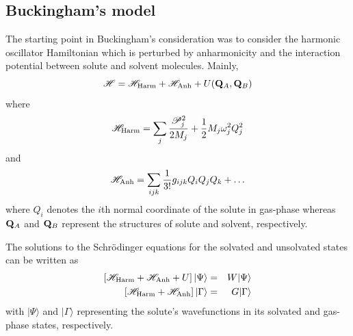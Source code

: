 \documentclass[a4paper,titlepage,twoside,fleqn,12pt]{book}
\begin{document}
\begin{refsection}
\section{Buckingham's model  \label{s:buckingham-theory}}

The starting point in Buckingham's consideration was to consider 
the harmonic oscillator Hamiltonian which is perturbed by anharmonicity
and the interaction potential between solute and solvent molecules. Mainly,
%
\begin{equation}
\mathscr{H} = \mathscr{H}_{\rm Harm} + \mathscr{H}_{\rm Anh} + U({\bf Q}_A,{\bf Q}_B)
\end{equation}
%
where
%
\begin{equation}\label{e:h_harm}
\mathscr{H}_{\rm Harm} = 
\sum_j \frac{\mathscr{P}_j^2}{2M_j} + \frac{1}{2} M_j \omega_j^2 Q_j^2
\end{equation}
%
and
%
\begin{equation}\label{e:h_anh}
\mathscr{H}_{\rm Anh} = 
\sum_{ijk} \frac{1}{3!} g_{ijk} Q_iQ_jQ_k + \ldots
\end{equation}
%
where $Q_i$ denotes the $i$th normal coordinate of the solute in gas-phase whereas
${\bf Q}_A$ and ${\bf Q}_B$ represent the structures of solute and solvent, 
respectively.

The solutions to the Schr{\"o}dinger equations for the solvated and 
unsolvated states can be written as
%
\begin{eqnarray}
\left[ \mathscr{H}_{\rm Harm} + \mathscr{H}_{\rm Anh} + U \right] 
\vert \Psi \rangle &=& W \vert \Psi \rangle \\
\left[ \mathscr{H}_{\rm Harm} + \mathscr{H}_{\rm Anh} \right] 
\vert \Gamma \rangle &=& G \vert \Gamma \rangle 
\end{eqnarray}
%
with $\vert\Psi\rangle$ and $\vert\Gamma\rangle$ representing the solute's wavefunctions
in its solvated and gas-phase states, respectively.


\end{refsection}
\end{document}
